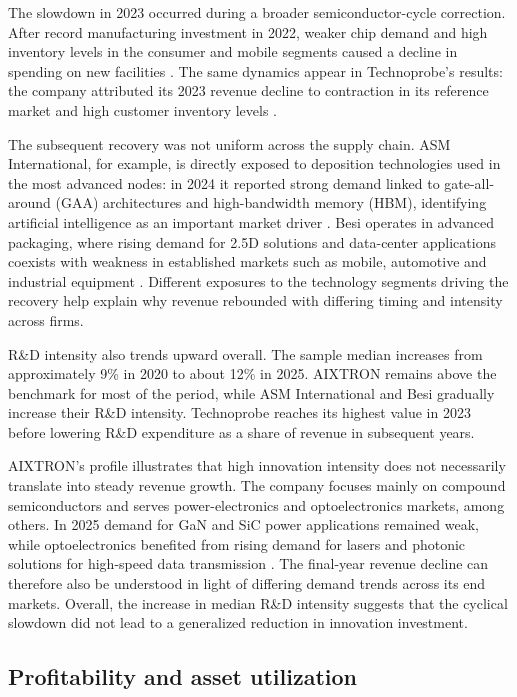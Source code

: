 \documentclass[11pt,a4paper]{article}
\begin{document}
The slowdown in 2023 occurred during a broader semiconductor-cycle correction. After record manufacturing investment in 2022, weaker chip demand and high inventory levels in the consumer and mobile segments caused a decline in spending on new facilities \citep{semi2023}. The same dynamics appear in Technoprobe's results: the company attributed its 2023 revenue decline to contraction in its reference market and high customer inventory levels \citep{technoprobe2023h1}.

The subsequent recovery was not uniform across the supply chain. ASM International, for example, is directly exposed to deposition technologies used in the most advanced nodes: in 2024 it reported strong demand linked to gate-all-around (GAA) architectures and high-bandwidth memory (HBM), identifying artificial intelligence as an important market driver \citep{asm2024q3}. Besi operates in advanced packaging, where rising demand for 2.5D solutions and data-center applications coexists with weakness in established markets such as mobile, automotive and industrial equipment \citep{besi2026}. Different exposures to the technology segments driving the recovery help explain why revenue rebounded with differing timing and intensity across firms.

R\&D intensity also trends upward overall. The sample median increases from approximately 9\% in 2020 to about 12\% in 2025. AIXTRON remains above the benchmark for most of the period, while ASM International and Besi gradually increase their R\&D intensity. Technoprobe reaches its highest value in 2023 before lowering R\&D expenditure as a share of revenue in subsequent years.

AIXTRON's profile illustrates that high innovation intensity does not necessarily translate into steady revenue growth. The company focuses mainly on compound semiconductors and serves power-electronics and optoelectronics markets, among others. In 2025 demand for GaN and SiC power applications remained weak, while optoelectronics benefited from rising demand for lasers and photonic solutions for high-speed data transmission \citep{aixtron2026}. The final-year revenue decline can therefore also be understood in light of differing demand trends across its end markets. Overall, the increase in median R\&D intensity suggests that the cyclical slowdown did not lead to a generalized reduction in innovation investment.

\subsection{Profitability and asset utilization}
\end{document}
